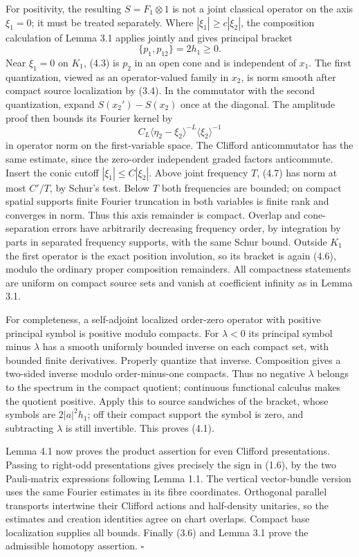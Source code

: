 \documentclass[
  11pt,
]{article}
\begin{document}
For positivity, the resulting \(S=F_1\otimes1\) is not a joint classical
operator on the axis \(\xi_1=0\); it must be treated separately. Where
\(|\xi_1|\geq c|\xi_2|\), the composition calculation of Lemma 3.1
applies jointly and gives principal bracket \[
 \{p_1,p_{12}\}=2h_1\geq0.
 \tag{4.6}
\] Near \(\xi_1=0\) on \(K_1\), (4.3) is \(p_2\) in an open cone and is
independent of \(x_1\). The first quantization, viewed as an
operator-valued family in \(x_2\), is norm smooth after compact source
localization by (3.4). In the commutator with the second quantization,
expand \(S(x_2')-S(x_2)\) once at the diagonal. The amplitude proof then
bounds its Fourier kernel by \[
 C_L\langle\eta_2-\xi_2\rangle^{-L}\langle\xi_2\rangle^{-1}
 \tag{4.7}
\] in operator norm on the first-variable space. The Clifford
anticommutator has the same estimate, since the zero-order independent
graded factors anticommute. Insert the conic cutoff
\(|\xi_1|\leq C|\xi_2|\). Above joint frequency \(T\), (4.7) has norm at
most \(C'/T\), by Schur's test. Below \(T\) both frequencies are
bounded; on compact spatial supports finite Fourier truncation in both
variables is finite rank and converges in norm. Thus this axis remainder
is compact. Overlap and cone-separation errors have arbitrarily
decreasing frequency order, by integration by parts in separated
frequency supports, with the same Schur bound. Outside \(K_1\) the first
operator is the exact position involution, so its bracket is again
(4.6), modulo the ordinary proper composition remainders. All
compactness statements are uniform on compact source sets and vanish at
coefficient infinity as in Lemma 3.1.

For completeness, a self-adjoint localized order-zero operator with
positive principal symbol is positive modulo compacts. For \(\lambda<0\)
its principal symbol minus \(\lambda\) has a smooth uniformly bounded
inverse on each compact set, with bounded finite derivatives. Properly
quantize that inverse. Composition gives a two-sided inverse modulo
order-minus-one compacts. Thus no negative \(\lambda\) belongs to the
spectrum in the compact quotient; continuous functional calculus makes
the quotient positive. Apply this to source sandwiches of the bracket,
whose symbols are \(2|a|^2h_1\); off their compact support the symbol is
zero, and subtracting \(\lambda\) is still invertible. This proves
(4.1).

Lemma 4.1 now proves the product assertion for even Clifford
presentations. Passing to right-odd presentations gives precisely the
sign in (1.6), by the two Pauli-matrix expressions following Lemma 1.1.
The vertical vector-bundle version uses the same Fourier estimates in
its fibre coordinates. Orthogonal parallel transports intertwine their
Clifford actions and half-density unitaries, so the estimates and
creation identities agree on chart overlaps. Compact base localization
supplies all bounds. Finally (3.6) and Lemma 3.1 prove the admissible
homotopy assertion. \(\square\)
\end{document}
